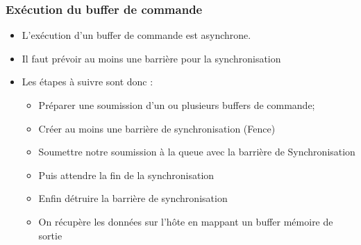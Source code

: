 \documentclass{beamer}
\begin{document}
\begin{frame}[fragile]
\frametitle{Exécution du buffer de commande}

\begin{center}
\end{center}
    
\begin{itemize}
\item L'exécution d'un buffer de commande est asynchrone.
\item Il faut prévoir au moins une barrière pour la synchronisation
\item Les étapes à suivre sont donc :
\begin{itemize}
\small
\item Préparer une soumission d'un ou plusieurs buffers de commande;
\item Créer au moins une barrière de synchronisation (Fence)
\item Soumettre notre soumission à la queue avec la barrière de Synchronisation
\item Puis attendre la fin de la synchronisation 
\item Enfin détruire la barrière de synchronisation
\item On récupère les données sur l'hôte en mappant un buffer mémoire de sortie
\end{itemize} 
\end{itemize}

\end{frame}
\end{document}
